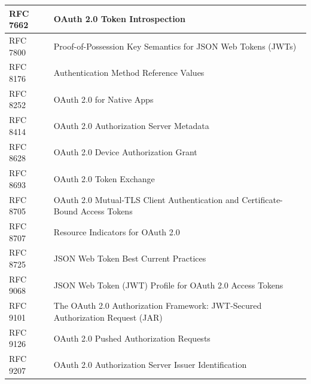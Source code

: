 \documentclass[
    fontsize=12pt,
    headings=small,
    parskip=half,           %
    bibliography=totoc,
    numbers=noenddot,       %
    open=any,               %
    ]{scrreprt}
\begin{document}
\begin{table}[H]
{\begin{tabular}{@{}ll@{}}
	\multicolumn{1}{|l|}{RFC 7662} & \multicolumn{1}{l|}{OAuth 2.0 Token Introspection}                                                  \\ \midrule
	\multicolumn{1}{|l|}{RFC 7800} & \multicolumn{1}{l|}{Proof-of-Possession Key Semantics for JSON Web Tokens (JWTs)}                   \\ \midrule
	\multicolumn{1}{|l|}{RFC 8176} & \multicolumn{1}{l|}{Authentication Method Reference Values}                                         \\ \midrule
	\multicolumn{1}{|l|}{RFC 8252} & \multicolumn{1}{l|}{OAuth 2.0 for Native Apps}                                                      \\ \midrule
	\multicolumn{1}{|l|}{RFC 8414} & \multicolumn{1}{l|}{OAuth 2.0 Authorization Server Metadata}                                        \\ \midrule
	\multicolumn{1}{|l|}{RFC 8628} & \multicolumn{1}{l|}{OAuth 2.0 Device Authorization Grant}                                           \\ \midrule
	\multicolumn{1}{|l|}{RFC 8693} & \multicolumn{1}{l|}{OAuth 2.0 Token Exchange}                                                       \\ \midrule
	\multicolumn{1}{|l|}{RFC 8705} & \multicolumn{1}{l|}{OAuth 2.0 Mutual-TLS Client Authentication and Certificate-Bound Access Tokens} \\ \midrule
	\multicolumn{1}{|l|}{RFC 8707} & \multicolumn{1}{l|}{Resource Indicators for OAuth 2.0}                                              \\ \midrule
	\multicolumn{1}{|l|}{RFC 8725} & \multicolumn{1}{l|}{JSON Web Token Best Current Practices}                                          \\ \midrule
	\multicolumn{1}{|l|}{RFC 9068} & \multicolumn{1}{l|}{JSON Web Token (JWT) Profile for OAuth 2.0 Access Tokens}                       \\ \midrule
	\multicolumn{1}{|l|}{RFC 9101} & \multicolumn{1}{l|}{The OAuth 2.0 Authorization Framework: JWT-Secured Authorization Request (JAR)} \\ \midrule
	\multicolumn{1}{|l|}{RFC 9126} & \multicolumn{1}{l|}{OAuth 2.0 Pushed Authorization Requests}                                        \\ \midrule
	\multicolumn{1}{|l|}{RFC 9207} & \multicolumn{1}{l|}{OAuth 2.0 Authorization Server Issuer Identification}                           \\ \midrule

\end{tabular}}
\end{table}
\end{document}
